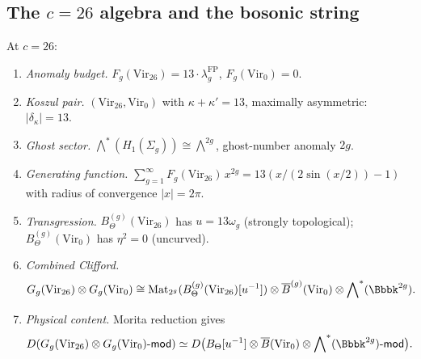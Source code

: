 %
%

\subsection{The $c = 26$ algebra and the bosonic string}

\begin{proposition}
At $c = 26$:
\begin{enumerate}[label=\textup{(\roman*)}]
\item \emph{Anomaly budget.}\;
$F_g(\mathrm{Vir}_{26}) = 13 \cdot \lambda_g^{\mathrm{FP}}$,
$F_g(\mathrm{Vir}_0) = 0$.

\item \emph{Koszul pair.}\;
$(\mathrm{Vir}_{26}, \mathrm{Vir}_0)$ with $\kappa + \kappa' = 13$,
maximally asymmetric: $|\delta_\kappa| = 13$.

\item \emph{Ghost sector.}\;
$\bigwedge^*(H_1(\Sigma_g)) \cong \bigwedge^{2g}$, ghost-number
anomaly $2g$.

\item \emph{Generating function.}\;
$\sum_{g=1}^\infty F_g(\mathrm{Vir}_{26})\,x^{2g}
= 13(x/(2\sin(x/2)) - 1)$
with radius of convergence $|x| = 2\pi$.

\item \emph{Transgression.}\;
$B_\Theta^{(g)}(\mathrm{Vir}_{26})$ has $u = 13\omega_g$
(strongly topological); $B_\Theta^{(g)}(\mathrm{Vir}_0)$ has
$\eta^2 = 0$ (uncurved).

\item \emph{Combined Clifford.}\;
\begin{equation}%
G_g(\mathrm{Vir}_{26}) \otimes G_g(\mathrm{Vir}_0)
\cong
\mathrm{Mat}_{2^g}(B_\Theta^{(g)}(\mathrm{Vir}_{26})[u^{-1}])
\otimes \barB^{(g)}(\mathrm{Vir}_0)
\otimes \bigwedge\nolimits^*(\Bbbk^{2g}).
\end{equation}

\item \emph{Physical content.}\; Morita reduction gives
\begin{equation}%
D(G_g(\mathrm{Vir}_{26}) \otimes G_g(\mathrm{Vir}_0)
\text{-}\mathsf{mod})
\simeq
D\bigl(B_\Theta[u^{-1}] \otimes \barB(\mathrm{Vir}_0) \otimes
\bigwedge\nolimits^*(\Bbbk^{2g})\text{-}\mathsf{mod}\bigr).
\end{equation}
\end{enumerate}
\end{proposition}


